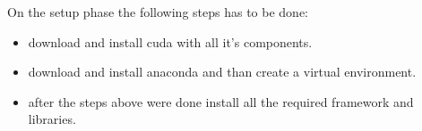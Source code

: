 On the setup phase the following steps has to be done: 
\begin{itemize}
    \item download and install cuda with all it's components.
    \item download and install anaconda and than create a virtual environment.
    \item after the steps above were done install all the required framework and libraries.
\end{itemize}
